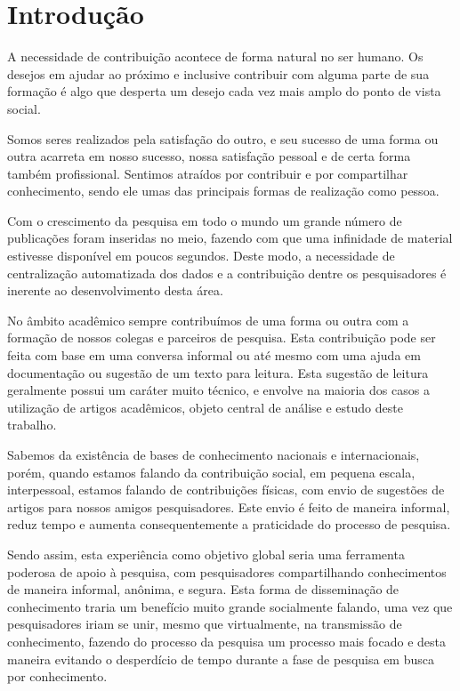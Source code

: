 \chapter[Introdução]{Introdução}

A necessidade de contribuição acontece de forma natural no ser humano. Os desejos em ajudar ao próximo e inclusive contribuir com alguma parte de sua formação é algo que desperta um desejo cada vez mais amplo do ponto de vista social.

Somos seres realizados pela satisfação do outro, e seu sucesso de uma forma ou outra acarreta em nosso sucesso, nossa satisfação pessoal e de certa forma também profissional. Sentimos atraídos por contribuir e por compartilhar conhecimento, sendo ele umas das principais formas de realização como pessoa.

Com o crescimento da pesquisa em todo o mundo um grande número de publicações foram inseridas no meio, fazendo com que uma infinidade de material estivesse disponível em poucos segundos. Deste modo, a necessidade de centralização automatizada dos dados e a contribuição dentre os pesquisadores é inerente ao desenvolvimento desta área. 

No âmbito acadêmico sempre contribuímos de uma forma ou outra com a formação de nossos colegas e parceiros de pesquisa. Esta contribuição pode ser feita com base em uma conversa informal ou até mesmo com uma ajuda em documentação ou sugestão de um texto para leitura. Esta sugestão de leitura geralmente possui um caráter muito técnico, e envolve na maioria dos casos a utilização de artigos acadêmicos, objeto central de análise e estudo deste trabalho.

Sabemos da existência de bases de conhecimento nacionais e internacionais, porém, quando estamos falando da contribuição social, em pequena escala, interpessoal, estamos falando de contribuições físicas, com envio de sugestões de artigos para nossos amigos pesquisadores. Este envio é feito de maneira informal, reduz tempo e aumenta consequentemente a praticidade do processo de pesquisa.

Sendo assim, esta experiência como objetivo global seria uma ferramenta poderosa de apoio à pesquisa, com pesquisadores compartilhando conhecimentos de maneira informal, anônima, e segura. Esta forma de disseminação de conhecimento traria um benefício muito grande socialmente falando, uma vez que pesquisadores iriam se unir, mesmo que virtualmente, na transmissão de conhecimento, fazendo do processo da pesquisa um processo mais focado e desta maneira evitando o desperdício de tempo durante a fase de pesquisa em busca por conhecimento.

